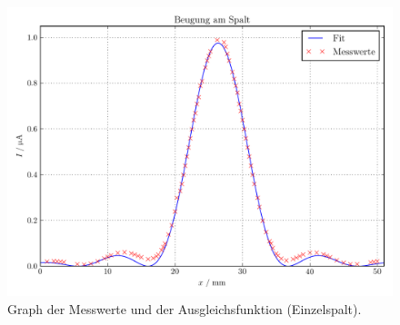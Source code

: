 \documentclass[
  bibliography=totoc,     %
  captions=tableheading,  %
  titlepage=firstiscover, %
]{scrartcl}
\begin{document}
\clearpage
\begin{figure}
  \centering
  \includegraphics[width=\textwidth]{Plot.pdf}
  \caption{Graph der Messwerte und der Ausgleichsfunktion (Einzelspalt).}
  \label{fig:plot1}
\end{figure}
\end{document}
